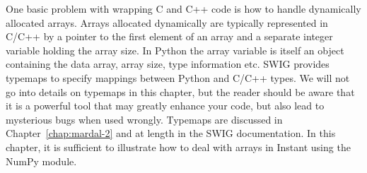 One basic problem with wrapping C and C++ code is how to handle
dynamically allocated arrays. Arrays allocated dynamically are
typically represented in C/C++ by a pointer to the first element of an
array and a separate integer variable holding the array size. In
Python the array variable is itself an object containing the data
array, array size, type information etc.  SWIG provides typemaps to
specify mappings between Python and C/C++ types. We will not go into
details on typemaps in this chapter, but the reader should be aware
that it is a powerful tool that may greatly enhance your code, but
also lead to mysterious bugs when used wrongly. Typemaps are discussed
in Chapter~\ref{chap:mardal-2} and at length in the SWIG
documentation.  In this chapter, it is sufficient to illustrate how to
deal with arrays in Instant using the NumPy module.

